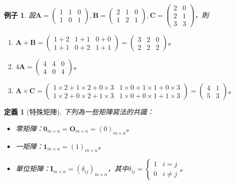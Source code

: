 \documentclass[12pt]{article}
\newtheorem{definition}{定義}
\newtheorem*{example}{例子}
\begin{document}
    \begin{example}
        設$\mathbf{A}=\begin{pmatrix}
            1&1&0\\1&0&1
        \end{pmatrix},\mathbf{B}=\begin{pmatrix}
            2&1&0\\1&2&1
        \end{pmatrix},\mathbf{C}=\begin{pmatrix}
            2&0\\2&1\\3&3
        \end{pmatrix}$，則\begin{enumerate}
            \item $\mathbf{A}+\mathbf{B}=\begin{pmatrix}
                1+2&1+1&0+0\\1+1&0+2&1+1
            \end{pmatrix}=\begin{pmatrix}
                3&2&0\\2&2&2
            \end{pmatrix}$。
            \item $4\mathbf{A}=\begin{pmatrix}
                4&4&0\\4&0&4
            \end{pmatrix}$。
            \item $\mathbf{A}\times\mathbf{C}=\begin{pmatrix}
                1\times2+1\times2+0\times3&1\times0+1\times1+0\times3\\1\times2+0\times2+1\times3&1\times0+0\times1+1\times3
            \end{pmatrix}=\begin{pmatrix}
                4&1\\5&3
            \end{pmatrix}$。
        \end{enumerate}
    \end{example}

    \begin{definition}[特殊矩陣]
        下列為一些矩陣寫法的共識：\begin{itemize}
            \item 零矩陣：$\mathbf{0}_{m\times n}=\mathbf{O}_{m\times n}=(0)_{m\times n}$。
            \item 一矩陣：$\mathbf{1}_{m\times n}=(1)_{m\times n}$。
            \item 單位矩陣：$\mathbf{I}_{m\times n}=(\delta_{ij})_{m\times n}$，其中$\delta_{ij}=\begin{cases}
                1 & i=j\\ 0 & i\neq j
            \end{cases}$。
        \end{itemize}
    \end{definition}
\end{document}
